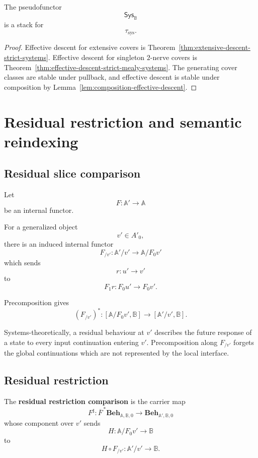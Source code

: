 \begin{corollary}
\label{cor:stack-strict-mealy-systems}
The pseudofunctor
\[
    \mathsf{Sys}_{\mathbb B}
\]
is a stack for
\[
    \tau_{\mathrm{sys}}.
\]
\end{corollary}

\begin{proof}
Effective descent for extensive covers is
Theorem~\ref{thm:extensive-descent-strict-systems}.
Effective descent for singleton \(2\)-nerve covers is
Theorem~\ref{thm:effective-descent-strict-mealy-systems}.
The generating cover classes are stable under pullback, and effective descent
is stable under composition by
Lemma~\ref{lem:composition-effective-descent}.
\end{proof}

\section{Residual restriction and semantic reindexing}
\label{sec:residual-restriction-semantic-reindexing}

\subsection{Residual slice comparison}
\label{subsec:residual-slice-comparison}

Let
\[
    F:\mathbb A'\to\mathbb A
\]
be an internal functor.

For a generalized object
\[
    v'\in A'_0,
\]
there is an induced internal functor
\[
    F_{/v'}:
    \mathbb A'/v'
    \to
    \mathbb A/F_0v'
\]
which sends
\[
    r:u'\to v'
\]
to
\[
    F_1r:F_0u'\to F_0v'.
\]

Precomposition gives
\[
    (F_{/v'})^\ast:
    [\mathbb A/F_0v',\mathbb B]
    \to
    [\mathbb A'/v',\mathbb B].
\]

Systems-theoretically, a residual behaviour at \(v'\) describes the future
response of a state to every input continuation entering \(v'\).
Precomposition along \(F_{/v'}\) forgets the global continuations which are
not represented by the local interface.

\subsection{Residual restriction}
\label{subsec:residual-restriction}

\begin{definition}
\label{def:residual-restriction-comparison}
The \textbf{residual restriction comparison} is the carrier map
\[
    F^\sharp:
    \overline F^{\,\ast}
    \mathbf{Beh}_{\mathbb A,\mathbb B,0}
    \to
    \mathbf{Beh}_{\mathbb A',\mathbb B,0}
\]
whose component over \(v'\) sends
\[
    H:
    \mathbb A/F_0v'\to\mathbb B
\]
to
\[
    H\circ F_{/v'}:
    \mathbb A'/v'\to\mathbb B.
\]
\end{definition}

